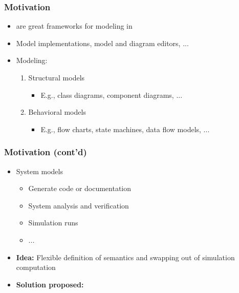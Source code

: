 \begin{frame}
  \frametitle{Motivation}
  \begin{block}{}
    \begin{itemize}
	      \item {} are great frameworks for modeling in 
	      \pause
	      \item Model implementations, model and diagram editors, ...
	      \pause
	      \item Modeling:
					\begin{enumerate}
							\item Structural models 
							\begin{itemize}
									\item E.g., class diagrams, component diagrams, ...
							\end{itemize}
							\pause
							\item Behavioral models
							\begin{itemize}
									\item E.g., flow charts, state machines, data flow models, ...
							\end{itemize}
					\end{enumerate}
    \end{itemize}
  \end{block}
\end{frame}



\begin{frame}
  \frametitle{Motivation (cont'd)}
  \begin{block}{}
\begin{center}
\end{center}
\small
\pause
    \begin{itemize}
	      \item System models
						\begin{itemize}
							\item Generate code or documentation
							\item System analysis and verification
							\item Simulation runs
							\item ...
						\end{itemize}
	      \pause
	      \item \textbf{Idea:} Flexible definition of semantics and swapping out of simulation computation 
	      \pause	
	      \item \textbf{Solution proposed:} 
    \end{itemize}
  \end{block}
\end{frame}



